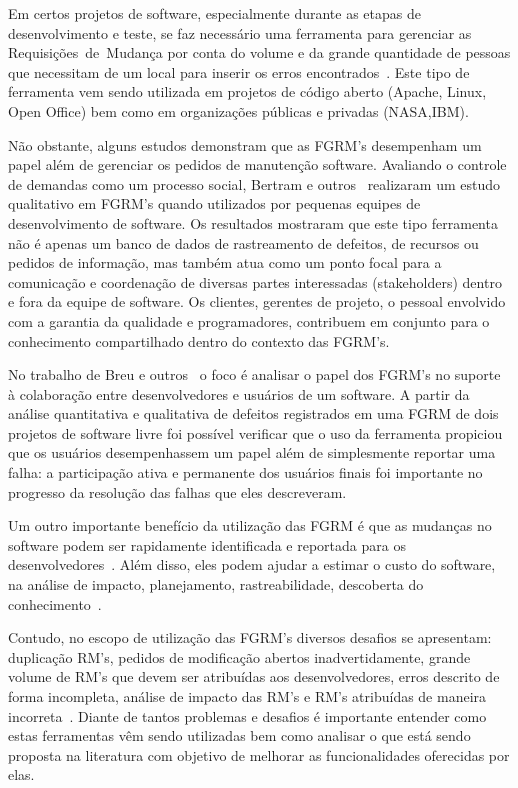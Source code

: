 Em certos projetos de software, especialmente durante as etapas de
desenvolvimento e teste, se faz necessário uma ferramenta para gerenciar
as Requisições~de~Mudança por conta do volume e da grande quantidade de pessoas
que necessitam de um local para inserir os erros encontrados~\cite{1407819}.
Este tipo de ferramenta vem sendo utilizada em projetos de código
aberto (Apache, Linux, Open Office) bem como em organizações públicas e privadas
(NASA,IBM).

Não obstante, alguns estudos demonstram que as FGRM's desempenham um papel além
de gerenciar os pedidos de manutenção software. Avaliando o controle de demandas
como um processo social, Bertram e
outros~\cite{Bertram:2010:CCB:1718918.1718972} realizaram um estudo qualitativo
em FGRM's quando utilizados por pequenas equipes de desenvolvimento de software.
Os resultados mostraram que este tipo ferramenta não é apenas um banco de dados
de rastreamento de defeitos, de recursos ou pedidos de informação, mas também
atua como um ponto focal para a comunicação e coordenação de diversas partes
interessadas (stakeholders) dentro e fora da equipe de software. Os clientes,
gerentes de projeto, o pessoal envolvido com a garantia da qualidade e
programadores, contribuem em conjunto para o conhecimento compartilhado dentro
do contexto das FGRM's.

No trabalho de Breu e outros~\cite{Breu:2010:INB:1718918.1718973} o foco é
analisar o papel dos FGRM's no suporte à colaboração entre desenvolvedores e
usuários de um software. A partir da análise quantitativa e qualitativa de
defeitos registrados em uma FGRM de dois projetos de software livre foi possível
verificar que o uso da ferramenta propiciou que os usuários desempenhassem um
papel além de simplesmente reportar uma falha: a participação ativa e permanente
dos usuários finais foi importante no progresso da resolução das falhas que eles
descreveram.

Um outro importante benefício da utilização das FGRM é que as mudanças no
software podem ser rapidamente identificada e reportada para os
desenvolvedores~\cite{anvik2005coping}. Além disso, eles podem ajudar a estimar
o custo do software, na análise de impacto, planejamento, rastreabilidade,
descoberta do conhecimento~\cite{cavalcanti2013bug}.

Contudo, no escopo de utilização das FGRM's diversos desafios se apresentam:
duplicação RM's, pedidos de modificação abertos inadvertidamente, grande
volume de RM's que devem ser atribuídas aos desenvolvedores, erros descrito
de forma incompleta, análise de impacto das RM's e RM's atribuídas de maneira
incorreta~\cite{cavalcanti2014challenges}.  Diante de tantos problemas e
desafios é importante entender como estas ferramentas vêm sendo
utilizadas bem como analisar o que está sendo proposta na literatura com objetivo
de melhorar as funcionalidades oferecidas por elas\@.

